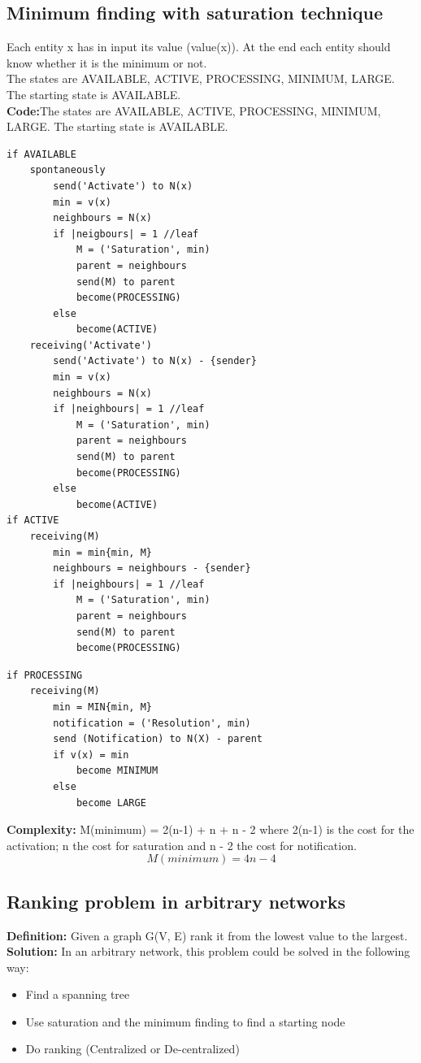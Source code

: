 \documentclass[paper=a4, fontsize=11pt]{scrartcl} %
\numberwithin{equation}{section} %
\numberwithin{figure}{section} %
\numberwithin{table}{section} %
\begin{document}
\subsection*{Minimum finding with saturation technique}
Each entity x has in input its value (value(x)). At the end each entity should know whether it is the minimum or not.\\
The states are AVAILABLE, ACTIVE, PROCESSING, MINIMUM, LARGE. The starting state is AVAILABLE.\\
\textbf{Code:}The states are AVAILABLE, ACTIVE, PROCESSING, MINIMUM, LARGE. The starting state is AVAILABLE.
\begin{lstlisting}
if AVAILABLE
	spontaneously
		send('Activate') to N(x)
		min = v(x)
		neighbours = N(x)
		if |neigbours| = 1 //leaf
			M = ('Saturation', min)
			parent = neighbours
			send(M) to parent
			become(PROCESSING)
		else
			become(ACTIVE)
	receiving('Activate')
		send('Activate') to N(x) - {sender}
		min = v(x)
		neighbours = N(x)
		if |neighbours| = 1	//leaf
			M = ('Saturation', min)
			parent = neighbours
			send(M) to parent
			become(PROCESSING)
		else
			become(ACTIVE)
if ACTIVE
	receiving(M)
		min = min{min, M}
		neighbours = neighbours - {sender}
		if |neighbours| = 1 //leaf
			M = ('Saturation', min)
			parent = neighbours	
			send(M) to parent
			become(PROCESSING)
\end{lstlisting}
\newpage
\begin{lstlisting}			
if PROCESSING
	receiving(M)
		min = MIN{min, M}
		notification = ('Resolution', min)
		send (Notification) to N(X) - parent
		if v(x) = min
			become MINIMUM
		else
			become LARGE									
\end{lstlisting}
\textbf{Complexity:} M(minimum) = 2(n-1) + n + n - 2 where 2(n-1) is the cost for the activation; n the cost for saturation and n - 2 the cost for notification.\\
$$M(minimum) = 4n - 4$$
\subsection*{Ranking problem in arbitrary networks}
\textbf{Definition:} Given a graph G(V, E) rank it from the lowest value to the largest.\\
\textbf{Solution:} In an arbitrary network, this problem could be solved in the following way:
\begin{itemize}
\item Find a spanning tree
\item Use saturation and the minimum finding to find a starting node
\item Do ranking (Centralized or De-centralized)
\end{itemize}
\end{document}
